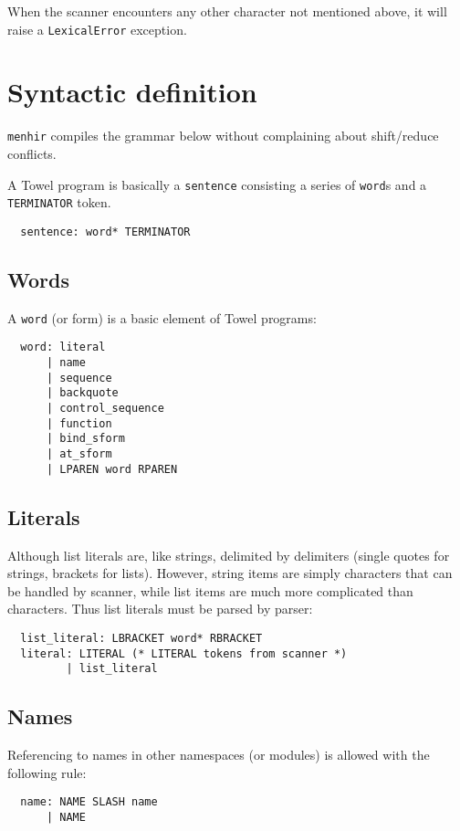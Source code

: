 \documentclass{book}
\begin{document}
When the scanner encounters any other character not mentioned above, it will raise a \texttt{LexicalError} exception.

\section{Syntactic definition}

\texttt{menhir} compiles the grammar below without complaining about shift/reduce conflicts.

A Towel program is basically a \texttt{sentence} consisting a series of \texttt{word}s and a \texttt{TERMINATOR} token.
\begin{verbatim}
  sentence: word* TERMINATOR
\end{verbatim}

\subsection{Words}

A \texttt{word} (or form) is a basic element of Towel programs:
\begin{verbatim}
  word: literal
      | name
      | sequence
      | backquote
      | control_sequence
      | function
      | bind_sform
      | at_sform
      | LPAREN word RPAREN
\end{verbatim}

\subsection{Literals}

Although list literals are, like strings, delimited by delimiters (single quotes for strings, brackets for lists). However, string items are simply characters that can be handled by scanner, while list items are much more complicated than characters. Thus list literals must be parsed by parser:
\begin{verbatim}
  list_literal: LBRACKET word* RBRACKET
  literal: LITERAL (* LITERAL tokens from scanner *)
         | list_literal
\end{verbatim}

\subsection{Names}

Referencing to names in other namespaces (or modules) is allowed with the following rule:
\begin{verbatim}
  name: NAME SLASH name
      | NAME
\end{verbatim}
\end{document}
